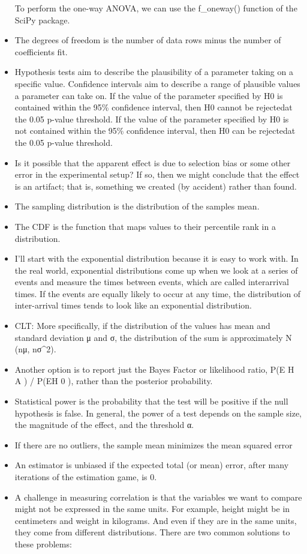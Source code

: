 \documentclass[]{book}
\begin{document}
\begin{itemize}
  To perform the one-way ANOVA, we can use the f\_oneway() function of
  the SciPy package.
\item
  The degrees of freedom is the number of data rows minus the number of
  coefficients fit.
\item
  Hypothesis tests aim to describe the plausibility of a parameter
  taking on a specific value. Confidence intervals aim to describe a
  range of plausible values a parameter can take on. If the value of the
  parameter specified by H0 is contained within the 95\% confidence
  interval, then H0 cannot be rejectedat the 0.05 p-value threshold. If
  the value of the parameter specified by H0 is not contained within the
  95\% confidence interval, then H0 can be rejectedat the 0.05 p-value
  threshold.
\item
  Is it possible that the apparent effect is due to selection bias or
  some other error in the experimental setup? If so, then we might
  conclude that the effect is an artifact; that is, something we created
  (by accident) rather than found.
\item
  The sampling distribution is the distribution of the samples mean.
\item
  The CDF is the function that maps values to their percentile rank in a
  distribution.
\item
  I'll start with the exponential distribution because it is easy to
  work with. In the real world, exponential distributions come up when
  we look at a series of events and measure the times between events,
  which are called interarrival times. If the events are equally likely
  to occur at any time, the distribution of inter-arrival times tends to
  look like an exponential distribution.
\item
  CLT: More specifically, if the distribution of the values has mean and
  standard deviation μ and σ, the distribution of the sum is
  approximately N (nμ, nσ\^{}2).
\item
  Another option is to report just the Bayes Factor or likelihood ratio,
  P(E \textbar{} H A ) / P(E\textbar{}H 0 ), rather than the posterior
  probability.
\item
  Statistical power is the probability that the test will be positive if
  the null hypothesis is false. In general, the power of a test depends
  on the sample size, the magnitude of the effect, and the threshold α.
\item
  If there are no outliers, the sample mean minimizes the mean squared
  error
\item
  An estimator is unbiased if the expected total (or mean) error, after
  many iterations of the estimation game, is 0.
\item
  A challenge in measuring correlation is that the variables we want to
  compare might not be expressed in the same units. For example, height
  might be in centimeters and weight in kilograms. And even if they are
  in the same units, they come from different distributions. There are
  two common solutions to these problems:
\end{itemize}
\end{document}
